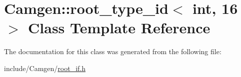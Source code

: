 \hypertarget{a00476}{\section{Camgen\-:\-:root\-\_\-type\-\_\-id$<$ int, 16 $>$ Class Template Reference}
\label{a00476}
}


The documentation for this class was generated from the following file\-:\begin{DoxyCompactItemize}
\item 
include/\-Camgen/\hyperlink{a00732}{root\-\_\-if.\-h}\end{DoxyCompactItemize}
